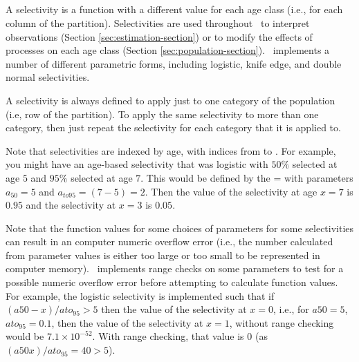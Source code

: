 \subsection{\label{sec:weightless-model}}

\subsection{\label{sec:maturity-notinpartition}}

\newpage

\subsection{\label{sec:selectivities}}

A selectivity is a function with a different value for each age class (i.e., for each column of the partition). Selectivities are used throughout \CAS\ to interpret observations (Section \ref{sec:estimation-section}) or to modify the effects of processes on each age class (Section \ref{sec:population-section}). \CAS\ implements a number of different parametric forms, including logistic, knife edge, and double normal selectivities.

A selectivity is always defined to apply just to one category of the population (i.e, row of the partition). To apply the same selectivity to more than one category, then just repeat the selectivity for each category that it is applied to.

Note that selectivities are indexed by age, with indices from  to . For example, you might have an age-based selectivity that was logistic with $50\%$ selected at age $5$ and $95\%$ selected at age $7$. This would be defined by the = with parameters $a_{50}=5$ and $a_{to95}=(7-5)=2$. Then the value of the selectivity at age $x=7$ is $0.95$ and the selectivity at $x=3$ is $0.05$.

Note that the function values for some choices of parameters for some selectivities can result in an computer numeric overflow error (i.e., the number calculated from parameter values is either too large or too small to be represented in computer memory). \CAS\ implements range checks on some parameters to test for a possible numeric overflow error before attempting to calculate function values. For example, the logistic selectivity is implemented such that if $(a50-x)/ato_95 > 5$ then the value of the selectivity at $x=0$, i.e., for $a50=5$, $ato_95=0.1$, then the value of the selectivity at $x=1$, without range checking would be $7.1 \times 10^{-52}$. With range checking, that value is $0$ (as $(a50 x)/ato_95=40 > 5$).

